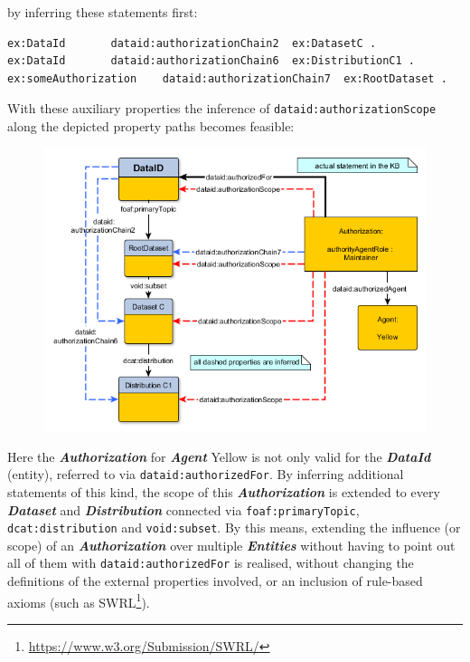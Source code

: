 \documentclass[a4paper,english,twoside,BCOR1.5cm,headsepline,DIV12,appendixprefix,final,12pt]{scrbook}
\newcommand{\prop}[1]{{{\texttt{#1}}}}
\newcommand{\important}[1]{\textbf{\textit{#1}}}
\newcommand\footnoteurl[1]{\footnote{\scriptsize\url{#1}}}
\begin{document}
by inferring these statements first:	
\begin{lstlisting}[language=ttl, captionpos=b,label=lst:coresuperset,linewidth=\columnwidth,breaklines=true]
ex:DataId 		dataid:authorizationChain2 	ex:DatasetC .
ex:DataId	 	dataid:authorizationChain6 	ex:DistributionC1 .
ex:someAuthorization 	dataid:authorizationChain7 	ex:RootDataset .
\end{lstlisting}

With these auxiliary properties the inference of \prop{dataid:authorizationScope} along the depicted property paths becomes feasible:


\begin{figure}[!htbp]
\centering
  \includegraphics[width=12cm]{images/AuthorizationExample.png}
  \label{fig:dlaxioms}
\end{figure}

Here the \important{Authorization} for \important{Agent} Yellow is not only valid for the \important{DataId} (entity), referred to via \prop{dataid:authorizedFor}. By inferring additional statements of this kind, the scope of this \important{Authorization} is extended to every \important{Dataset} and \important{Distribution} connected via \prop{foaf:primaryTopic}, \prop{dcat:distribution} and \prop{void:subset}. By this means, extending the influence (or scope) of an \important{Authorization} over multiple \important{Entities} without having to point out all of them with \prop{dataid:authorizedFor} is realised, without changing the definitions of the external properties involved, or an inclusion of rule-based axioms (such as SWRL\footnoteurl{https://www.w3.org/Submission/SWRL/}).
\end{document}

